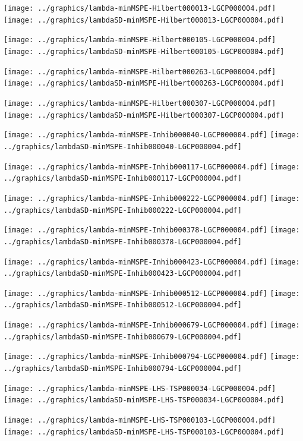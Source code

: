 \documentclass[review]{elsarticle}
\begin{document}
\texttt{[image: ../graphics/lambda-minMSPE-Hilbert000013-LGCP000004.pdf]}
\texttt{[image: ../graphics/lambdaSD-minMSPE-Hilbert000013-LGCP000004.pdf]}

\texttt{[image: ../graphics/lambda-minMSPE-Hilbert000105-LGCP000004.pdf]}
\texttt{[image: ../graphics/lambdaSD-minMSPE-Hilbert000105-LGCP000004.pdf]}

\texttt{[image: ../graphics/lambda-minMSPE-Hilbert000263-LGCP000004.pdf]}
\texttt{[image: ../graphics/lambdaSD-minMSPE-Hilbert000263-LGCP000004.pdf]}

\texttt{[image: ../graphics/lambda-minMSPE-Hilbert000307-LGCP000004.pdf]}
\texttt{[image: ../graphics/lambdaSD-minMSPE-Hilbert000307-LGCP000004.pdf]}

\texttt{[image: ../graphics/lambda-minMSPE-Inhib000040-LGCP000004.pdf]}
\texttt{[image: ../graphics/lambdaSD-minMSPE-Inhib000040-LGCP000004.pdf]}

\texttt{[image: ../graphics/lambda-minMSPE-Inhib000117-LGCP000004.pdf]}
\texttt{[image: ../graphics/lambdaSD-minMSPE-Inhib000117-LGCP000004.pdf]}

\texttt{[image: ../graphics/lambda-minMSPE-Inhib000222-LGCP000004.pdf]}
\texttt{[image: ../graphics/lambdaSD-minMSPE-Inhib000222-LGCP000004.pdf]}

\texttt{[image: ../graphics/lambda-minMSPE-Inhib000378-LGCP000004.pdf]}
\texttt{[image: ../graphics/lambdaSD-minMSPE-Inhib000378-LGCP000004.pdf]}

\texttt{[image: ../graphics/lambda-minMSPE-Inhib000423-LGCP000004.pdf]}
\texttt{[image: ../graphics/lambdaSD-minMSPE-Inhib000423-LGCP000004.pdf]}

\texttt{[image: ../graphics/lambda-minMSPE-Inhib000512-LGCP000004.pdf]}
\texttt{[image: ../graphics/lambdaSD-minMSPE-Inhib000512-LGCP000004.pdf]}

\texttt{[image: ../graphics/lambda-minMSPE-Inhib000679-LGCP000004.pdf]}
\texttt{[image: ../graphics/lambdaSD-minMSPE-Inhib000679-LGCP000004.pdf]}

\texttt{[image: ../graphics/lambda-minMSPE-Inhib000794-LGCP000004.pdf]}
\texttt{[image: ../graphics/lambdaSD-minMSPE-Inhib000794-LGCP000004.pdf]}

\texttt{[image: ../graphics/lambda-minMSPE-LHS-TSP000034-LGCP000004.pdf]}
\texttt{[image: ../graphics/lambdaSD-minMSPE-LHS-TSP000034-LGCP000004.pdf]}

\texttt{[image: ../graphics/lambda-minMSPE-LHS-TSP000103-LGCP000004.pdf]}
\texttt{[image: ../graphics/lambdaSD-minMSPE-LHS-TSP000103-LGCP000004.pdf]}
\end{document}
